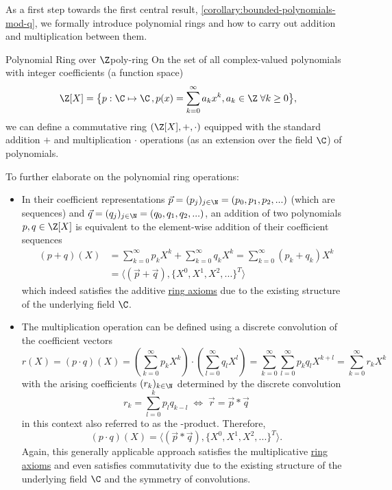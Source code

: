 As a first step towards the first central result, \autoref{corollary:bounded-polynomials-mod-q}, we formally introduce polynomial rings and how to carry out addition and multiplication between them.

\begin{definition}{Polynomial Ring over $\Z$}{poly-ring}
  On the set of all complex-valued polynomials with integer coefficients (a function space)
  $$\Z[X] = \big\{p: \C \mapsto \C \,, p(x) = \sum_{k=0}^\infty a_k x^k, a_k \in \Z \;\forall k \geq 0\big\},$$
  we can define a commutative ring $(\Z[X], +, \cdot)$ equipped with the standard addition $+$ and multiplication $\cdot$ operations (as an extension over the field $\C$) of polynomials.
\end{definition}

To further elaborate on the polynomial ring operations:
\begin{itemize}
  \item In their coefficient representations $\vec{p} = (p_j)_{j\in\N} = (p_0, p_1, p_2, ...)$ (which are sequences) and $\vec{q} = (q_j)_{j\in\N} = (q_0, q_1, q_2, ...)$,
        an addition of two polynomials $p, q \in \Z[X]$ is equivalent to the element-wise addition of their coefficient sequences
        \begin{align*}
          (p + q)(X) & = \sum_{k=0}^\infty p_k X^k + \sum_{k=0}^\infty q_k X^k = \sum_{k=0}^\infty (p_k + q_k) X^k \\
                     & = \langle (\vec{p} + \vec{q}), \{X^0, X^1, X^2, ...\}^T \rangle
        \end{align*}
        which indeed satisfies the additive \hyperref[def:ring]{ring axioms}
        due to the existing structure of the underlying field $\C$.
  \item The multiplication operation can be defined using a discrete convolution of the coefficient vectors
        $$r(X) = (p \cdot q)(X) = (\sum_{k=0}^\infty p_k X^k) \cdot (\sum_{l=0}^\infty q_l X^l)
          = \sum_{k=0}^\infty \sum_{l=0}^\infty p_k q_l X^{k+l}
          = \sum_{k=0}^\infty r_k X^k$$
        with the arising coefficients $(r_k)_{k\in\N}$ determined by the discrete convolution
        $$r_k = \sum_{l=0}^k p_l q_{k-l} \;\Leftrightarrow\; \vec{r} = \vec{p} * \vec{q}$$
        in this context also referred to as the -product. Therefore,
        $$(p \cdot q)(X) = \langle (\vec{p} * \vec{q}), \{X^0, X^1, X^2, ...\}^T \rangle.$$
        Again, this generally applicable approach satisfies the multiplicative \hyperref[def:ring]{ring axioms}
        and even satisfies commutativity due to the existing structure of the underlying field $\C$
        and the symmetry of convolutions.
\end{itemize}


